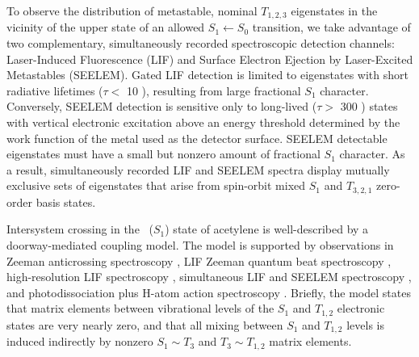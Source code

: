 \documentclass[12pt]{mitthesis}
\begin{document}
To observe the distribution of metastable, nominal $T_{1,2,3}$
eigenstates in the vicinity of the upper state of an allowed $S_1
\leftarrow S_0$ transition, we take advantage of two complementary,
simultaneously recorded spectroscopic detection channels:
Laser-Induced Fluorescence (LIF) and Surface Electron Ejection by
Laser-Excited Metastables (SEELEM).  Gated LIF detection is limited to
eigenstates with short radiative lifetimes ($\tau <$ 10 \microsec),
resulting from large fractional $S_1$ character.  Conversely, SEELEM
detection is sensitive only to long-lived ($\tau >$ 300 \microsec)
states with vertical electronic excitation above an energy threshold
determined by the work function of the metal used as the detector
surface.  SEELEM detectable eigenstates must have a small but nonzero
amount of fractional $S_1$ character.  As a result, simultaneously
recorded LIF and SEELEM spectra display mutually exclusive sets of
eigenstates that arise from spin-orbit mixed $S_1$ and $T_{3,2,1}$
zero-order basis states.

Intersystem crossing in the \astate\ ($S_1$) state of acetylene is
well-described by a doorway-mediated coupling model.  The model is
supported by observations in Zeeman anticrossing spectroscopy
\cite{dupre91, dupre95a, dupre95b}, LIF Zeeman quantum beat
spectroscopy \cite{ochi87, ochi91, dupre93}, high-resolution LIF
spectroscopy \cite{drabbels94, altunata01}, simultaneous LIF and
SEELEM spectroscopy \cite{humphrey97, altunata00, mishra04}, and
photodissociation plus H-atom action spectroscopy \cite{yamakita03,
  loffler98, mordaunt98}.  Briefly, the model states that matrix
elements between vibrational levels of the $S_1$ and $T_{1,2}$
electronic states are very nearly zero, and that all mixing between
$S_1$ and $T_{1,2}$ levels is induced indirectly by nonzero $S_1 \sim
T_3$ and $T_3 \sim T_{1,2}$ matrix elements.

\end{document}
